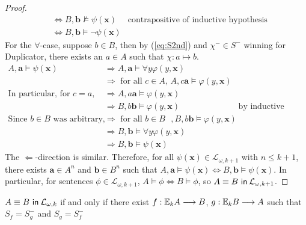 \begin{prop}
\begin{proof}
\begin{align*}
&\Leftrightarrow B,\mathbf{b} \not\vDash \psi(\mathbf{x})  & \text{contrapositive of inductive hypothesis}\\
&\Leftrightarrow B,\mathbf{b} \vDash \neg\psi(\mathbf{x}) 
\end{align*}
For the $\forall$-case, suppose $b \in B$, then by (\ref{eq:S2nd}) and $\chi^{-} \in S^{-}$ winning for Duplicator, there exists an $a \in A$ such that $\chi:a \mapsto b$. 
\begin{align*}
A,\mathbf{a} \vDash \psi(\mathbf{x})  &\Rightarrow A,\mathbf{a} \vDash \forall y \varphi(y,\mathbf{x}) \\
&\Rightarrow \text{ for all $c \in A$, } A,c\mathbf{a} \vDash \varphi(y,\mathbf{x}) \\
\text{In particular, for $c = a$,} &\Rightarrow A,a\mathbf{a} \vDash \varphi(y,\mathbf{x})\\
&\Rightarrow B,b\mathbf{b} \vDash \varphi(y,\mathbf{x}) & \text{by inductive hypothesis}\\
\text{Since $b \in B$ was arbitrary,} &\Rightarrow \text{ for all $b \in B$ }, B,b\mathbf{b} \vDash \varphi(y,\mathbf{x}) \\
&\Rightarrow B,\mathbf{b} \vDash \forall y \varphi(y,\mathbf{x}) \\ 
&\Rightarrow B,\mathbf{b} \vDash \psi(\mathbf{x}) 
\end{align*}
The $\Leftarrow$-direction is similar. Therefore, for all $\psi(\mathbf{x}) \in \mathcal{L}_{\omega,k+1}$ with $n \leq k+1$, there exists $\mathbf{a} \in A^{n}$ and $\mathbf{b} \in B^{n}$ such that $A,\mathbf{a} \vDash \psi(\mathbf{x}) \Leftrightarrow B,\mathbf{b} \vDash \psi(\mathbf{x})$. In particular, for sentences $\phi \in \mathcal{L}_{\omega,k+1}$, $A \vDash \phi \Leftrightarrow B \vDash \phi$, so ${A \equiv B \ \mathsf{in}\: \mathcal{L}_{\omega,k+1}}$. 
\end{proof}
\begin{cor}
${A \equiv B \ \mathsf{in}\: \mathcal{L}_{\omega,k}}$ if and only if there exist $f:{\mathbb{E}_{k}A} \longrightarrow B$, $g:{\mathbb{E}_{k}B} \longrightarrow A$ such that $S_{f} = S_{g}^{-}$ and $S_{g} = S_{f}^{-}$ 
\label{cor:backForthEF}
\end{cor}
\end{prop}
